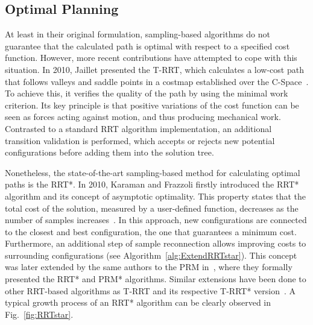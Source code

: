 \subsection{Optimal Planning}
\label{sec:SamplOptimalPlan}

At least in their original formulation, sampling-based algorithms do not
guarantee that the calculated path is optimal with respect to a specified cost
function. However, more recent contributions have attempted to cope with this
situation. In 2010, Jaillet \etal presented the \ac{T-RRT}, which calculates a
low-cost path that follows valleys and saddle points in a costmap established
over the \ac{C-Space}~\cite{Jaillet2010}. To achieve this, it verifies the
quality of the path by using the minimal work criterion. Its key principle is
that positive variations of the cost function can be seen as forces acting
against motion, and thus producing mechanical work. Contrasted to a standard
\ac{RRT} algorithm implementation, an additional transition validation is
performed, which accepts or rejects new potential configurations before adding
them into the solution tree.

Nonetheless, the state-of-the-art sampling-based method for calculating optimal
paths is the \ac{RRT*}. In 2010, Karaman and Frazzoli firstly introduced the
\ac{RRT*} algorithm and its concept of asymptotic optimality. This property
states that the total cost of the solution, measured by a user-defined function,
decreases as the number of samples increases~\cite{Karaman2010a}. In this
approach, new configurations are connected to the closest and best
configuration, \ie the one that guarantees a minimum cost. Furthermore, an
additional step of sample reconnection allows improving costs to surrounding
configurations (see Algorithm~\ref{alg:ExtendRRTstar}). This concept was later
extended by the same authors to the \ac{PRM} in~\cite{Karaman2011}, where they
formally presented the \ac{RRT*} and PRM* algorithms. Similar extensions have
been done to other RRT-based algorithms as \ac{T-RRT} and its respective T-RRT*
version~\cite{Devaurs2016}. A typical growth process of an \ac{RRT*} algorithm
can be clearly observed in Fig.~\ref{fig:RRTstar}.

